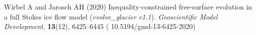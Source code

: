 \documentclass[review]{igs}
\begin{document}
\begin{thebibliography}{34}
Wirbel A and Jarosch AH (2020) Inequality-constrained free-surface evolution in
  a full {S}tokes ice flow model (\textit{evolve\_glacier v1.1}).
  \emph{Geoscientific Model Development}, \textbf{13}(12), 6425--6445 (\doi
  {10.5194/gmd-13-6425-2020})

\end{thebibliography}
\end{document}
